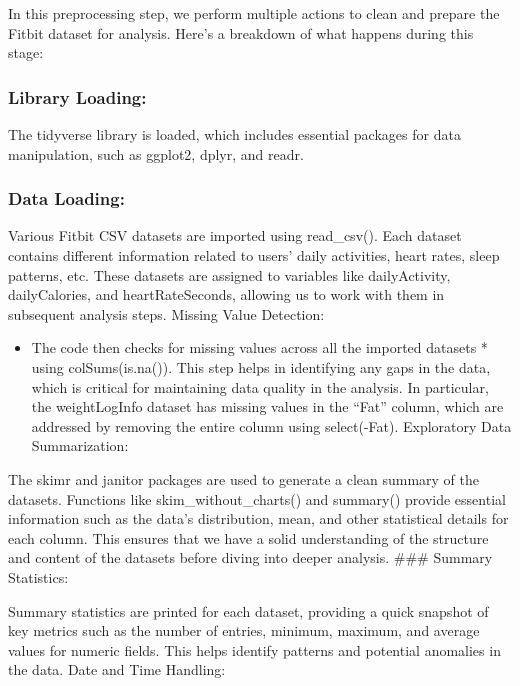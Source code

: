 \documentclass[
]{article}
\providecommand{\tightlist}{%
  \setlength{\itemsep}{0pt}\setlength{\parskip}{0pt}}
\begin{document}
In this preprocessing step, we perform multiple actions to clean and
prepare the Fitbit dataset for analysis. Here's a breakdown of what
happens during this stage:

\hypertarget{library-loading}{%
\subsubsection{Library Loading:}\label{library-loading}}

The tidyverse library is loaded, which includes essential packages for
data manipulation, such as ggplot2, dplyr, and readr.

\hypertarget{data-loading}{%
\subsubsection{Data Loading:}\label{data-loading}}

Various Fitbit CSV datasets are imported using read\_csv(). Each dataset
contains different information related to users' daily activities, heart
rates, sleep patterns, etc. These datasets are assigned to variables
like dailyActivity, dailyCalories, and heartRateSeconds, allowing us to
work with them in subsequent analysis steps. Missing Value Detection:

\begin{itemize}
\tightlist
\item
  The code then checks for missing values across all the imported
  datasets * using colSums(is.na()). This step helps in identifying any
  gaps in the data, which is critical for maintaining data quality in
  the analysis. In particular, the weightLogInfo dataset has missing
  values in the ``Fat'' column, which are addressed by removing the
  entire column using select(-Fat). Exploratory Data Summarization:
\end{itemize}

The skimr and janitor packages are used to generate a clean summary of
the datasets. Functions like skim\_without\_charts() and summary()
provide essential information such as the data's distribution, mean, and
other statistical details for each column. This ensures that we have a
solid understanding of the structure and content of the datasets before
diving into deeper analysis. \#\#\# Summary Statistics:

Summary statistics are printed for each dataset, providing a quick
snapshot of key metrics such as the number of entries, minimum, maximum,
and average values for numeric fields. This helps identify patterns and
potential anomalies in the data. Date and Time Handling:
\end{document}
